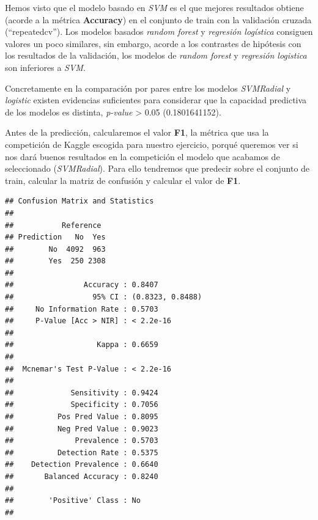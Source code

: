 \documentclass[]{article}
\newenvironment{Shaded}{\begin{snugshade}}{\end{snugshade}}
\newcommand{\DataTypeTok}[1]{\textcolor[rgb]{0.13,0.29,0.53}{#1}}
\newcommand{\KeywordTok}[1]{\textcolor[rgb]{0.13,0.29,0.53}{\textbf{#1}}}
\newcommand{\NormalTok}[1]{#1}
\newcommand{\OperatorTok}[1]{\textcolor[rgb]{0.81,0.36,0.00}{\textbf{#1}}}
\newcommand{\StringTok}[1]{\textcolor[rgb]{0.31,0.60,0.02}{#1}}
\begin{document}
Hemos visto que el modelo basado en \emph{SVM} es el que mejores
resultados obtiene (acorde a la métrica \textbf{Accuracy}) en el
conjunto de train con la validación cruzada (``repeatedcv''). Los
modelos basados \emph{random forest} y \emph{regresión logística}
consiguen valores un poco similares, sin embargo, acorde a los
contrastes de hipótesis con los resultados de la validación, los modelos
de \emph{random forest} y \emph{regresión logistica} son inferiores a
\emph{SVM}.

Concretamente en la comparación por pares entre los modelos
\emph{SVMRadial} y \emph{logistic} existen evidencias suficientes para
considerar que la capacidad predictiva de los modelos es distinta,
\emph{p-value} \textgreater{} 0.05 (0.1801641152).

Antes de la predicción, calcularemos el valor \textbf{F1}, la
métrica que usa la competición de Kaggle escogida para nuestro
ejercicio, porqué queremos ver si nos dará buenos resultados en la
competición el modelo que acabamos de seleccionado (\emph{SVMRadial}).
Para ello tendremos que predecir sobre el conjunto de train, calcular la
matriz de confusión y calcular el valor de \textbf{F1}.

\begin{Shaded}
\end{Shaded}

\begin{verbatim}
## Confusion Matrix and Statistics
## 
##           Reference
## Prediction   No  Yes
##        No  4092  963
##        Yes  250 2308
##                                           
##                Accuracy : 0.8407          
##                  95% CI : (0.8323, 0.8488)
##     No Information Rate : 0.5703          
##     P-Value [Acc > NIR] : < 2.2e-16       
##                                           
##                   Kappa : 0.6659          
##                                           
##  Mcnemar's Test P-Value : < 2.2e-16       
##                                           
##             Sensitivity : 0.9424          
##             Specificity : 0.7056          
##          Pos Pred Value : 0.8095          
##          Neg Pred Value : 0.9023          
##              Prevalence : 0.5703          
##          Detection Rate : 0.5375          
##    Detection Prevalence : 0.6640          
##       Balanced Accuracy : 0.8240          
##                                           
##        'Positive' Class : No              
## 
\end{verbatim}
\end{document}
